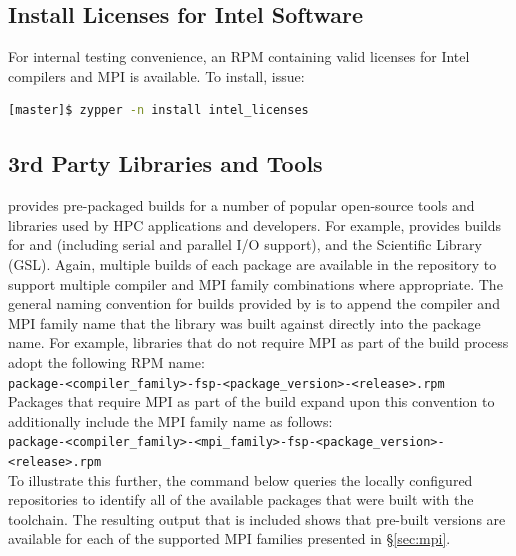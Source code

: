 \documentclass[letterpaper]{article}
\begin{document}
\subsection{Install Licenses for Intel Software}

For internal testing convenience, an RPM containing valid licenses for Intel
compilers and MPI is available. To install, issue:

\begin{lstlisting}[language=bash,keywords={},upquote=true]
[master]$ zypper -n install intel_licenses
\end{lstlisting}

\subsection{3rd Party Libraries and Tools} \label{sec:3rdparty}

\FSP{} provides pre-packaged builds for a number of popular open-source
tools and libraries used by HPC applications and developers. For
example, \FSP{} provides builds for \FFTW{} and \hdffive{} (including serial and parallel
I/O support), and the \GNU{} Scientific Library (GSL). Again, multiple builds of
each package are available in the \FSP{} repository to support multiple compiler
and MPI family combinations where appropriate. The general naming convention
for builds provided by \FSP{} is to append the compiler and MPI family name that
the library was built against directly into the package name. For example,
libraries that do not require MPI as part of the build process adopt the
following RPM name: \\

\noindent
\texttt{package-<compiler\_family>-fsp-<package\_version>-<release>.rpm} \\

\noindent Packages that require MPI as part of the build expand upon this convention to
additionally include the MPI family name as follows: \\

\noindent
\texttt{package-<compiler\_family>-<mpi\_family>-fsp-<package\_version>-<release>.rpm} \\

To illustrate this further, the command below queries the locally configured
repositories to identify all of the available \FFTW{} packages that were built
with the \GNU{} toolchain. The resulting output that is included shows that
pre-built versions are available for each of the supported MPI families
presented in \S\ref{sec:mpi}.
\end{document}
